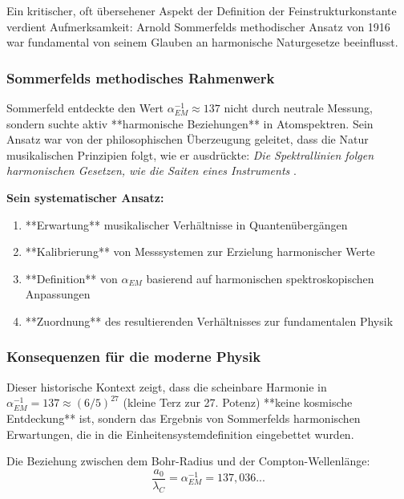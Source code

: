 \documentclass[12pt,a4paper]{article}
\begin{document}
	Ein kritischer, oft übersehener Aspekt der Definition der Feinstrukturkonstante verdient Aufmerksamkeit: Arnold Sommerfelds methodischer Ansatz von 1916 war fundamental von seinem Glauben an harmonische Naturgesetze beeinflusst.
	
	\subsubsection{Sommerfelds methodisches Rahmenwerk}
	
	Sommerfeld entdeckte den Wert $\alpha_{EM}^{-1} \approx 137$ nicht durch neutrale Messung, sondern suchte aktiv **harmonische Beziehungen** in Atomspektren. Sein Ansatz war von der philosophischen Überzeugung geleitet, dass die Natur musikalischen Prinzipien folgt, wie er ausdrückte: \textit{Die Spektrallinien folgen harmonischen Gesetzen, wie die Saiten eines Instruments} \cite{Sommerfeld1916}.
	
	\begin{tcolorbox}[colback=orange!5!white,colframe=orange!75!black,title=Sommerfelds harmonische Methodik]
		\textbf{Sein systematischer Ansatz:}
		\begin{enumerate}
			\item **Erwartung** musikalischer Verhältnisse in Quantenübergängen
			\item **Kalibrierung** von Messsystemen zur Erzielung harmonischer Werte  
			\item **Definition** von $\alpha_{EM}$ basierend auf harmonischen spektroskopischen Anpassungen
			\item **Zuordnung** des resultierenden Verhältnisses zur fundamentalen Physik
		\end{enumerate}
	\end{tcolorbox}
	
	\subsubsection{Konsequenzen für die moderne Physik}
	
	Dieser historische Kontext zeigt, dass die scheinbare Harmonie in $\alpha_{EM}^{-1} = 137 \approx (6/5)^{27}$ (kleine Terz zur 27. Potenz) **keine kosmische Entdeckung** ist, sondern das Ergebnis von Sommerfelds harmonischen Erwartungen, die in die Einheitensystemdefinition eingebettet wurden.
	
	Die Beziehung zwischen dem Bohr-Radius und der Compton-Wellenlänge:
	\begin{equation}
		\frac{a_0}{\lambda_C} = \alpha_{EM}^{-1} = 137,036...
	\end{equation}
	
\end{document}
